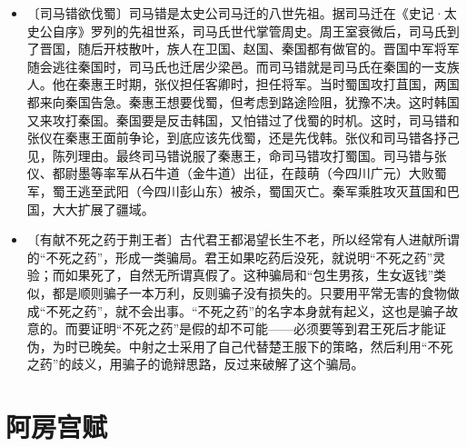 \documentclass[12pt,UTF-8,openany,a4]{ctexbook}
\begin{document}
\begin{itemize}
    \item〔司马错欲伐蜀〕{\yiwen 司马错是太史公司马迁的八世先祖。据司马迁在《史记·太史公自序》罗列的先祖世系，司马氏世代掌管周史。周王室衰微后，司马氏到了晋国，随后开枝散叶，族人在卫国、赵国、秦国都有做官的。晋国中军将军随会逃往秦国时，司马氏也迁居少梁邑。而司马错就是司马氏在秦国的一支族人。他在秦惠王时期，张仪担任客卿时，担任将军。当时蜀国攻打苴国，两国都来向秦国告急。秦惠王想要伐蜀，但考虑到路途险阻，犹豫不决。这时韩国又来攻打秦国。秦国要是反击韩国，又怕错过了伐蜀的时机。这时，司马错和张仪在秦惠王面前争论，到底应该先伐蜀，还是先伐韩。张仪和司马错各抒己见，陈列理由。最终司马错说服了秦惠王，命司马错攻打蜀国。司马错与张仪、都尉墨等率军从石牛道（金牛道）出征，在葭萌（今四川广元）大败蜀军，蜀王逃至武阳（今四川彭山东）被杀，蜀国灭亡。秦军乘胜攻灭苴国和巴国，大大扩展了疆域。}
    \item〔有献不死之药于荆王者〕{\yiwen 古代君王都渴望长生不老，所以经常有人进献所谓的“不死之药”，形成一类骗局。君王如果吃药后没死，就说明“不死之药”灵验；而如果死了，自然无所谓真假了。这种骗局和“包生男孩，生女返钱”类似，都是顺则骗子一本万利，反则骗子没有损失的。只要用平常无害的食物做成“不死之药”，就不会出事。“不死之药”的名字本身就有起义，这也是骗子故意的。而要证明“不死之药”是假的却不可能——必须要等到君王死后才能证伪，为时已晚矣。中射之士采用了自己代替楚王服下的策略，然后利用“不死之药”的歧义，用骗子的诡辩思路，反过来破解了这个骗局。}
\end{itemize}

\chapter{阿房宫赋}
\end{document}
